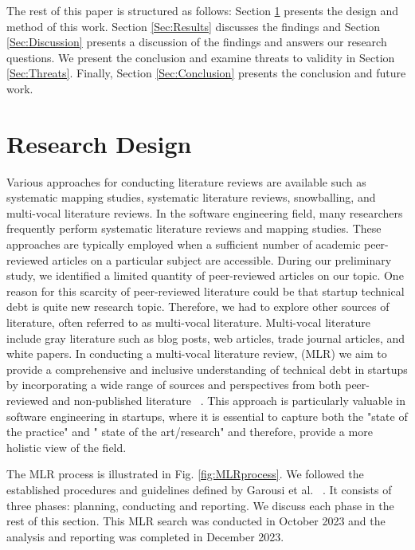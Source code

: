 \documentclass[manuscript]{acmart}
\begin{document}
The rest of this paper is structured as follows: Section \ref{Sec:Research} presents the design and method of this work. Section \ref{Sec:Results} discusses the findings and Section \ref{Sec:Discussion} presents a discussion of the findings and answers our research questions. We present the conclusion and examine threats to validity in Section \ref{Sec:Threats}. Finally, Section \ref{Sec:Conclusion} presents the conclusion and future work.

\section{Research Design}\label{Sec:Research}
Various approaches for conducting literature reviews are available such as systematic mapping studies, systematic literature reviews, snowballing, and multi-vocal literature reviews. In the software engineering field, many researchers frequently perform systematic literature reviews and mapping studies. These approaches are typically employed when a sufficient number of academic peer-reviewed articles on a particular subject are accessible. During our preliminary study, we identified a limited quantity of peer-reviewed articles on our topic. One reason for this scarcity of peer-reviewed literature could be that startup technical debt is quite new research topic. Therefore, we had to explore other sources of literature, often referred to as multi-vocal literature. Multi-vocal literature include gray literature such as blog posts, web articles, trade journal articles, and white papers. In conducting a multi-vocal literature review, (MLR) we aim to provide a comprehensive and inclusive understanding of technical debt in startups by incorporating a wide range of sources and perspectives from both peer-reviewed and non-published literature ~\cite{Ogawa91, Garousi2016/2915970.2916008}. This approach is particularly valuable in software engineering in startups, where it is essential to capture both the "state of the practice" and " state of the art/research" and therefore, provide a more holistic view of the field. 

The MLR process is illustrated in Fig. \ref{fig:MLRprocess}. We followed the established procedures and guidelines defined by Garousi et al. ~\cite{GAROUSI2019101}. It consists of three phases: planning, conducting and reporting. We discuss each phase in the rest of this section. This MLR search was conducted in October 2023 and the analysis and reporting was completed in December 2023.
\end{document}

